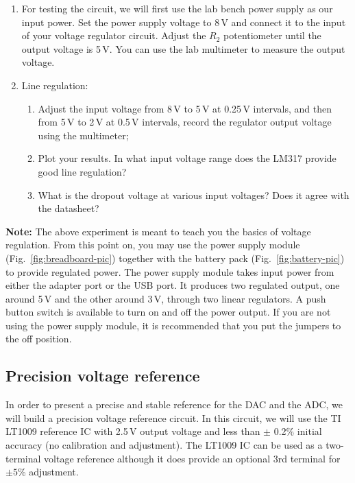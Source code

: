 \documentclass[letterpaper, 11pt]{article}
\begin{document}
\begin{enumerate}
\item For testing the circuit, we will first use the lab bench power supply as our input power. Set the power supply voltage to 8\,V and connect it to the input of your voltage regulator circuit. Adjust the $R_2$ potentiometer until the output voltage is 5\,V. You can use the lab multimeter to measure the output voltage. 

\item Line regulation: 
	\begin{enumerate}
		\item Adjust the input voltage from 8\,V to 5\,V at 0.25\,V intervals, and then from 5\,V to 2\,V at 0.5\,V intervals, record the regulator output voltage using the multimeter; 
		\item Plot your results. In what input voltage range does the LM317 provide good line regulation? 
		\item What is the dropout voltage at various input voltages? Does it agree with the datasheet?
	\end{enumerate}
	

\end{enumerate}

\textbf{Note:} The above experiment is meant to teach you the basics of voltage regulation. From this point on, you may use the power supply module (Fig.~\ref{fig:breadboard-pic}) together with the battery pack (Fig.~\ref{fig:battery-pic}) to provide regulated power. The power supply module takes input power from either the adapter port or the USB port. It produces two regulated output, one around 5\,V and the other around 3\,V, through two linear regulators. A push button switch is available to turn on and off the power output. If you are not using the power supply module, it is recommended that you put the jumpers to the off position. 

\subsection{Precision voltage reference}
\label{sec:lt1009}

In order to present a precise and stable reference for the DAC and the ADC, we will build a precision voltage reference circuit. In this circuit, we will use the TI LT1009 reference IC with 2.5\,V output voltage and less than $\pm$ 0.2\% initial accuracy (no calibration and adjustment). The LT1009 IC can be used as a two-terminal voltage reference although it does provide an optional 3rd terminal for $\pm 5$\% adjustment.
\end{document}
